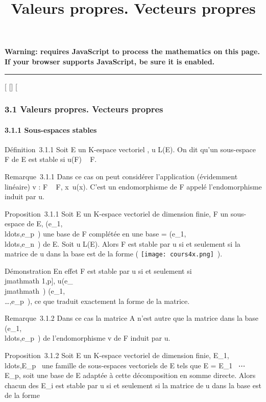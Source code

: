 \documentclass[]{article}
\title{Valeurs propres. Vecteurs propres}
\author{}
\date{}
\begin{document}
\maketitle

\textbf{Warning: 
requires JavaScript to process the mathematics on this page.\\ If your
browser supports JavaScript, be sure it is enabled.}

\begin{center}\rule{3in}{0.4pt}\end{center}

{[}
{[}{]}
{[}

\subsubsection{3.1 Valeurs propres. Vecteurs propres}

\paragraph{3.1.1 Sous-espaces stables}

Définition~3.1.1 Soit E un K-espace vectoriel , u \in L(E). On dit qu'un
sous-espace F de E est stable si u(F) \subset~ F.

Remarque~3.1.1 Dans ce cas on peut considérer l'application (évidemment
linéaire) v : F \rightarrow~ F, x\mapsto~u(x). C'est un
endomorphisme de F appelé l'endomorphisme induit par u.

Proposition~3.1.1 Soit E un K-espace vectoriel de dimension finie, F un
sous-espace de E,
(e_1,\\ldots,e_p~)
une base de F complétée en une base  =
(e_1,\\ldots,e_n~)
de E. Soit u \in L(E). Alors F est stable par u si et seulement si la
matrice de u dans la base  est de la forme \left (
\texttt{[image: cours4x.png]} \,\right ).

Démonstration En effet F est stable par u si et seulement si
\forall~\\jmathmath \in {[}1,p{]}, u(e_\\jmathmath~)
\in\mathrmVect(e_1,\\\ldots,e_p~),
ce que traduit exactement la forme de la matrice.

Remarque~3.1.2 Dans ce cas la matrice A n'est autre que la matrice dans
la base
(e_1,\\ldots,e_p~)
de l'endomorphisme v de F induit par u.

Proposition~3.1.2 Soit E un K-espace vectoriel de dimension finie,
E_1,\\ldots,E_p~
une famille de sous-espaces vectoriels de E tels que E = E_1
\oplus~⋯ \oplus~ E_p, soit  une base de E
adaptée à cette décomposition en somme directe. Alors chacun des
E_i est stable par u si et seulement si la matrice de u dans la
base  est de la forme
\end{document}
